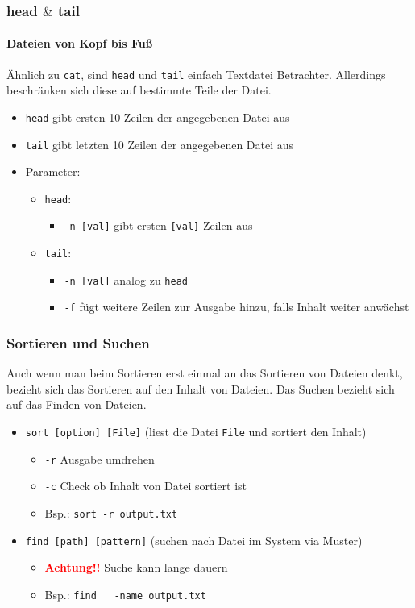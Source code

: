 \documentclass[12pt,utf8, handout]{beamer}
\begin{document}
\begin{frame}
\frametitle{head $\&$ tail}
\framesubtitle{\textcolor{ownDarkOr}{Dateien von Kopf bis Fuß}}
Ähnlich zu \texttt{cat}, sind \texttt{head} und \texttt{tail} einfach Textdatei Betrachter. Allerdings beschränken sich diese auf bestimmte Teile der Datei.
\begin{itemize}
	\item \texttt{head} gibt ersten 10 Zeilen der angegebenen Datei aus
	\item \texttt{tail} gibt letzten 10 Zeilen der angegebenen Datei aus
	\item Parameter:
	\begin{itemize}
		\item \texttt{head}:
		\begin{itemize}[<+->]
			\item {\scriptsize \texttt{-n [val]} gibt ersten \texttt{[val]} Zeilen aus }
		\end{itemize}
		\item \texttt{tail}:
		\begin{itemize}[<+->]
			\item {\scriptsize \texttt{-n [val]} analog zu \texttt{head}}
			\item {\scriptsize \texttt{-f} fügt weitere Zeilen zur Ausgabe hinzu, falls Inhalt weiter anwächst}
		\end{itemize}
	\end{itemize}
\end{itemize}
\end{frame}

\begin{frame}
\frametitle{Sortieren und Suchen}
Auch wenn man beim Sortieren erst einmal an das Sortieren von Dateien denkt,
bezieht sich das Sortieren auf den Inhalt von Dateien.
Das Suchen bezieht sich auf das Finden von Dateien.
\begin{itemize}[<+->]
	\item \texttt{sort [option] [File]} (liest die Datei \texttt{File} und sortiert den Inhalt)
	\begin{itemize}[<+->]
		\item \texttt{-r} Ausgabe umdrehen
		\item \texttt{-c} Check ob Inhalt von Datei sortiert ist
		\item Bsp.: \texttt{sort -r output.txt}
	\end{itemize}
	\item \texttt{find [path] [pattern]} (suchen nach Datei im System via Muster)
	\begin{itemize}[<+->]
		\item \textbf{\textcolor{red}{Achtung!!}} Suche kann lange dauern
		\item Bsp.: \texttt{find ~ -name output.txt}
	\end{itemize}
\end{itemize}
\end{frame}
\end{document}
